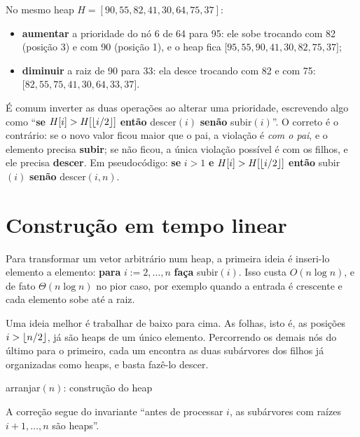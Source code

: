 \begin{exemplo}\label{ex:heapalt}
No mesmo heap $H=[90,55,82,41,30,64,75,37]$:
\begin{itemize}
  \item \textbf{aumentar} a prioridade do nó 6 de 64 para 95: ele sobe trocando com 82 (posição 3) e com 90 (posição 1), e o heap fica $[95,55,90,41,$\allowbreak$30,82,75,37]$;
  \item \textbf{diminuir} a raiz de 90 para 33: ela desce trocando com 82 e com 75: $[82,55,75,41,$\allowbreak$30,64,33,37]$.
\end{itemize}
\end{exemplo}

\begin{cuidado}
É comum inverter as duas operações ao alterar uma prioridade, escrevendo algo como ``\textbf{se} $H[i]>H[\lfloor i/2\rfloor]$ \textbf{então} descer$(i)$ \textbf{senão} subir$(i)$''. O correto é o contrário: se o novo valor ficou maior que o pai, a violação é \emph{com o pai}, e o elemento precisa \textbf{subir}; se não ficou, a única violação possível é com os filhos, e ele precisa \textbf{descer}. Em pseudocódigo: \textbf{se} $i>1$ \textbf{e} $H[i]>H[\lfloor i/2\rfloor]$ \textbf{então} subir$(i)$ \textbf{senão} descer$(i,n)$.
\end{cuidado}

\section{Construção em tempo linear}\label{sec:arranjar}
Para transformar um vetor arbitrário num heap, a primeira ideia é inseri-lo elemento a elemento: \textbf{para} $i:=2,\dots,n$ \textbf{faça} subir$(i)$. Isso custa $O(n\log n)$, e de fato $\Theta(n\log n)$ no pior caso, por exemplo quando a entrada é crescente e cada elemento sobe até a raiz.

Uma ideia melhor é trabalhar de baixo para cima. As folhas, isto é, as posições $i>\lfloor n/2\rfloor$, já são heaps de um único elemento. Percorrendo os demais nós do último para o primeiro, cada um encontra as duas subárvores dos filhos já organizadas como heaps, e basta fazê-lo descer.
\begin{pseudo}{arranjar$(n)$: construção do heap}
\begin{algorithmic}
   \State {} \EndFor
\EndProcedure
\end{algorithmic}
\end{pseudo}
A correção segue do invariante ``antes de processar $i$, as subárvores com raízes $i+1,\dots,n$ são heaps''.

